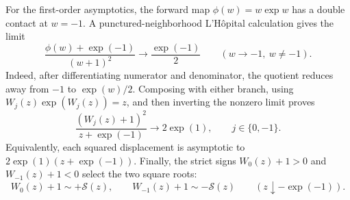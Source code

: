 \documentclass[11pt,oneside]{article}
\theoremstyle{definition}
\theoremstyle{remark}
\begin{document}
For the first-order asymptotics, the forward map
\(\phi(w)=w\exp w\) has a double contact at \(w=-1\).  A
punctured-neighborhood L'H\^opital calculation gives the limit
\begin{equation}
 \frac{\phi(w)+\exp(-1)}{(w+1)^2}
 \longrightarrow\frac{\exp(-1)}2
 \qquad(w\to-1,\ w\ne-1).                                \label{eq:lambert-forward-quadratic-ratio}
\end{equation}
Indeed, after differentiating numerator and denominator, the quotient reduces away
from \(-1\) to \(\exp(w)/2\).  Composing with either branch, using
\(W_j(z)\exp(W_j(z))=z\), and then inverting the nonzero limit proves
\begin{equation}
 \frac{(W_j(z)+1)^2}{z+\exp(-1)}\longrightarrow2\exp(1),
 \qquad j\in\{0,-1\}.                                    \label{eq:lambert-branch-squared-ratio}
\end{equation}
Equivalently, each squared displacement is asymptotic to
\(2\exp(1)(z+\exp(-1))\).  Finally, the strict signs
\(W_0(z)+1>0\) and \(W_{-1}(z)+1<0\) select the two square roots:
\begin{equation}
 W_0(z)+1\sim +\mathcal S(z),
 \qquad
 W_{-1}(z)+1\sim -\mathcal S(z)
 \qquad(z\downarrow-\exp(-1)).                            \label{eq:lambert-branch-signed-sqrt}
\end{equation}
\end{document}
